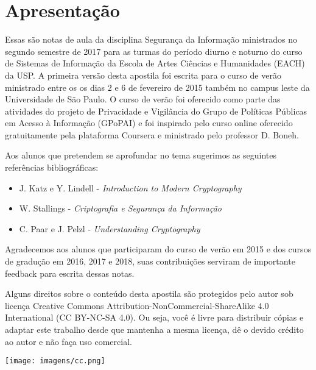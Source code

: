 \chapter*{Apresentação}

Essas são notas de aula da disciplina Segurança da Informação ministrados no segundo semestre de 2017 para as turmas do período diurno e noturno do curso de Sistemas de Informação da Escola de Artes Ciências e Humanidades (EACH) da USP.
A primeira versão desta apostila foi escrita para o curso de verão ministrado entre os os dias 2 e 6 de fevereiro de 2015 também no campus leste da Universidade de São Paulo. 
O curso de verão foi oferecido como parte das atividades do projeto de Privacidade e Vigilância do Grupo de Políticas Públicas em Acesso à Informação (GPoPAI) e foi inspirado pelo curso online oferecido gratuitamente pela plataforma Coursera e ministrado pelo professor D. Boneh.

Aos alunos que pretendem se aprofundar no tema sugerimos as seguintes referências bibliográficas:

\begin{itemize}
\item J. Katz e Y. Lindell - {\em Introduction to Modern Cryptography}
\item W. Stallings - {\em Criptografia e Segurança da Informação}
\item C. Paar e J. Pelzl - {\em Understanding Cryptography}
\end{itemize}

Agradecemos aos alunos que participaram do curso de verão em 2015 e dos cursos de gradução em 2016, 2017 e 2018, suas contribuições serviram de importante feedback para escrita dessas notas.

Alguns direitos sobre o conteúdo desta apostila são protegidos pelo autor sob licença Creative Commons
Attribution-NonCommercial-ShareAlike 4.0 International (CC BY-NC-SA 4.0). Ou seja, você  é livre para distribuir cópias e adaptar este trabalho desde que mantenha a mesma licença, dê o devido crédito ao autor e não faça uso comercial.

\begin{center}
  \texttt{[image: imagens/cc.png]}
\end{center}